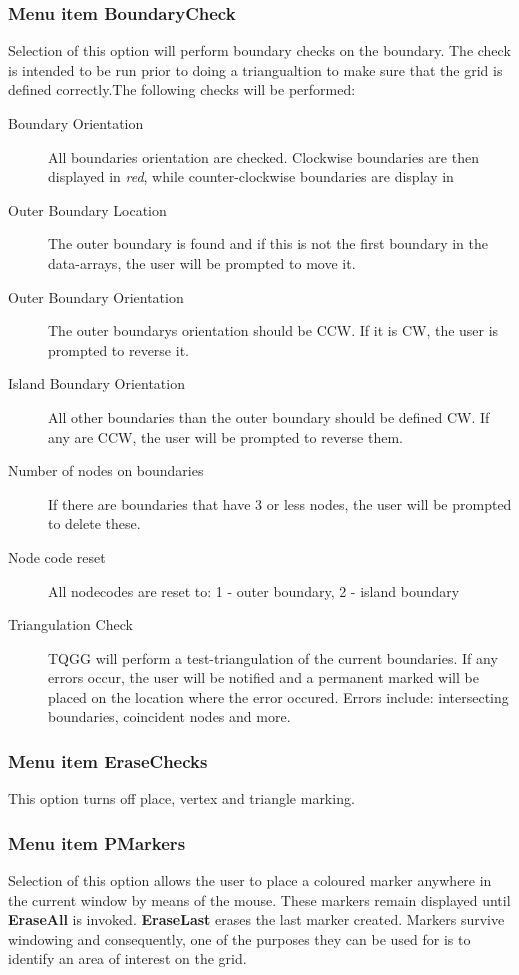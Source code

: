 \documentclass{article}
\begin{document}
\subsubsection{Menu item BoundaryCheck}
Selection of this option will perform boundary checks on the boundary. The check is intended to be run prior to doing a triangualtion to make sure that the grid is defined correctly.The following checks will be performed:
\begin{description}
\item[Boundary Orientation] All boundaries orientation are checked. Clockwise boundaries are then displayed in \emph{red}, while counter-clockwise boundaries are display in 
\item[Outer Boundary Location] The outer boundary is found and if this is not the first boundary in the data-arrays, the user will be prompted to move it.
\item[Outer Boundary Orientation] The outer boundarys orientation should be CCW. If it is CW, the user is prompted to reverse it.
\item[Island Boundary Orientation] All other boundaries than the outer boundary should be defined CW. If any are CCW, the user will be prompted to reverse them.
\item[Number of nodes on boundaries] If there are boundaries that have 3 or less nodes, the user will be prompted to delete these.
\item[Node code reset] All nodecodes are reset to: 1 - outer boundary, 2 - island boundary
\item[Triangulation Check] TQGG will perform a test-triangulation of the current boundaries. If any errors occur, the user will be notified and a permanent marked will be placed on the location where the error occured. Errors include: intersecting boundaries, coincident nodes and more.
\end{description}

\subsubsection{Menu item EraseChecks}
This option turns off place, vertex and triangle marking.

\subsubsection{Menu item PMarkers}
Selection of this option allows the user to place a coloured marker anywhere in the current window by means of the mouse. These markers remain displayed until \textbf{EraseAll} is invoked. \textbf{EraseLast} erases the last marker created. Markers survive windowing and consequently, one of the purposes they can be used for is to identify an area of interest on the grid.
\end{document}
